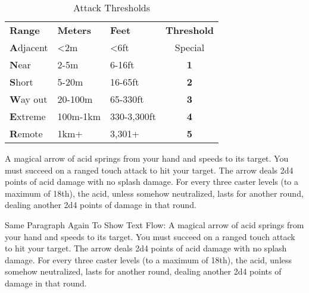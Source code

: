 
\begin{wraptable}[9]{L}{8cm} \vspace{-0.6cm}
\centering {} \caption{Attack Thresholds}
\begin{tabular}{l l l c}
\textbf{Range} & \textbf{Meters} & \textbf{Feet} & \textbf{Threshold}\\
\textbf{A}djacent & <2m & <6ft & Special\\
\textbf{N}ear & 2-5m & 6-16ft & \textbf{1}\\
\textbf{S}hort & 5-20m & 16-65ft & \textbf{2}\\
\textbf{W}ay out & 20-100m & 65-330ft & \textbf{3}\\
\textbf{E}xtreme & 100m-1km & 330-3,300ft & \textbf{4}\\
\textbf{R}emote & 1km+ & 3,301+ & \textbf{5}\\
\end{tabular}
\end{wraptable}

A magical arrow of acid springs from your hand and speeds to its target. You must succeed on a ranged touch attack to hit your target. The arrow deals 2d4 points of acid damage with no splash damage. For every three caster levels (to a maximum of 18th), the acid, unless somehow neutralized, lasts for another round, dealing another 2d4 points of damage in that round.

Same Paragraph Again To Show Text Flow: A magical arrow of acid springs from your hand and speeds to its target. You must succeed on a ranged touch attack to hit your target. The arrow deals 2d4 points of acid damage with no splash damage. For every three caster levels (to a maximum of 18th), the acid, unless somehow neutralized, lasts for another round, dealing another 2d4 points of damage in that round.


